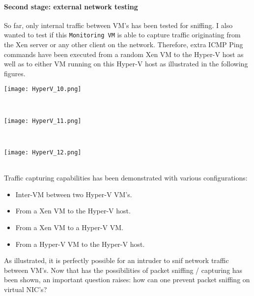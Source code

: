 \paragraph{Second stage: external network testing}
So far, only internal traffic between VM's has been tested for sniffing. I also wanted to test if this \texttt{Monitoring VM} is able to capture traffic originating from the Xen server or any other client on the network.
Therefore, extra ICMP Ping commands have been executed from a random Xen VM to the Hyper-V host as well as to either VM running on this Hyper-V host as illustrated in the following figures.
\noindent\begin{minipage}{\textwidth}
    \centering
    \texttt{[image: HyperV\_10.png]}
\label{fig:network}
\end{minipage}
$\;$ \\ \\
\noindent\begin{minipage}{\textwidth}
    \centering
    \texttt{[image: HyperV\_11.png]}
\label{fig:network}
\end{minipage}
$\;$ \\ \\
\noindent\begin{minipage}{\textwidth}
    \centering
    \texttt{[image: HyperV\_12.png]}
\label{fig:network}
\end{minipage}
$\;$ \\ \\
Traffic capturing capabilities has been demonstrated with various configurations:
\begin{itemize}
\item Inter-VM between two Hyper-V VM's.
\item From a Xen VM to the Hyper-V host.
\item From a Xen VM to a Hyper-V VM.
\item From a Hyper-V VM to the Hyper-V host.
\end{itemize}
As illustrated, it is perfectly possible for an intruder to snif network traffic between VM's. Now that has the possibilities of packet sniffing / capturing has been shown, an important question raises: how can one prevent packet sniffing on virtual NIC's?



